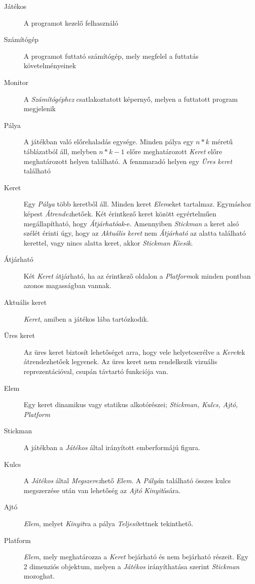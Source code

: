 \begin{description}

    \item[Játékos] A programot kezelő felhasználó
    \item[Számítógép] A programot futtató számítógép, mely megfelel a futtatás követelményeinek
    \item[Monitor] A \emph{Számítógéphez} csatlakoztatott képernyő, melyen a futtatott program megjelenik
    \item[Pálya] A játékban való előrehaladás egysége. Minden pálya egy $n*k$ méretű táblázatból áll, melyben $n*k-1$ előre meghatározott \emph{Keret} előre meghatározott helyen található. A fennmaradó helyen egy \emph{Üres keret} található
    \item[Keret] Egy \emph{Pálya} több keretből áll. Minden keret \emph{Elem}eket tartalmaz. Egymáshoz képest \emph{Átrendez}hetőek. Két érintkező keret között egyértelműen megállapítható, hogy \emph{Átjárhatóak}-e. Amennyiben \emph{Stickman} a keret alsó szélét érinti úgy, hogy az \emph{Aktuális keret} nem \emph{Átjárható} az alatta található kerettel, vagy nincs alatta keret, akkor \emph{Stickman} \emph{Kiesik}.
    \item[Átjárható] Két \emph{Keret} átjárható, ha az érintkező oldalon a \emph{Platform}ok minden pontban azonos magasságban vannak.
    \item[Aktuális keret] \emph{Keret}, amiben a játékos lába tartózkodik.
    \item[Üres keret] Az üres keret biztosít lehetőséget arra, hogy vele helyetcserélve a \emph{Keret}ek átrendezhetőek legyenek. Az üres keret nem rendelkezik vizuális reprezentációval, csupán távtartó funkciója van.
    \item[Elem] Egy keret dinamikus vagy statikus alkotórészei; \emph{Stickman, Kulcs, Ajtó, Platform}
    \item[Stickman] A játékban a \emph{Játékos} által irányított emberformájú figura.
    \item[Kulcs] A \emph{Játékos} által \emph{Megszerez}hető \emph{Elem}. A \emph{Pályá}n található összes kulcs megszerzése után van lehetőség az \emph{Ajtó} \emph{Kinyit}ására.
    \item[Ajtó] \emph{Elem}, melyet \emph{Kinyit}va a pálya \emph{Teljesít}ettnek tekinthető.
    \item[Platform] \emph{Elem}, mely meghatározza a \emph{Keret} bejárható és nem bejárható részeit. Egy 2 dimenziós objektum, melyen a \emph{Játékos} irányíthatása szerint \emph{Stickman} mozoghat.

\end{description}
